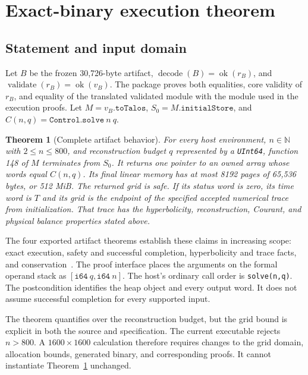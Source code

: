 \documentclass[11pt]{article}
\newcommand{\code}[1]{\texttt{#1}}
\newcommand{\NN}{\mathbb{N}}
\newtheorem{theorem}{Theorem}[section]
\begin{document}
\section{Exact-binary execution theorem}

\subsection{Statement and input domain}

Let $B$ be the frozen 30,726-byte artifact, $\operatorname{decode}(B)=\operatorname{ok}(r_B)$, and $\operatorname{validate}(r_B)=\operatorname{ok}(v_B)$.  The package proves both equalities, core validity of $r_B$, and equality of the translated validated module with the module used in the execution proofs.  Let $M=v_B.\code{toTalos}$, $S_0=M.\code{initialStore}$, and $C(n,q)=\code{Control.solve}\ n\ q$.

\begin{theorem}[Complete artifact behavior]
\label{thm:artifact}
For every host environment, $n\in\NN$ with $2\leq n\leq800$, and reconstruction budget $q$ represented by a \code{UInt64}, function 148 of $M$ terminates from $S_0$.  It returns one pointer to an owned array whose words equal $C(n,q)$.  Its final linear memory has at most 8192 pages of 65,536 bytes, or 512 MiB.  The returned grid is safe.  If its status word is zero, its time word is $T$ and its grid is the endpoint of the specified accepted numerical trace from initialization.  That trace has the hyperbolicity, reconstruction, Courant, and physical balance properties stated above.
\end{theorem}

The four exported artifact theorems establish these claims in increasing scope: exact execution, safety and successful completion, hyperbolicity and trace facts, and conservation~\cite{spec,artifact}.  The proof interface places the arguments on the formal operand stack as $[\code{i64}\ q,\code{i64}\ n]$.  The host's ordinary call order is \code{solve(n,q)}.  The postcondition identifies the heap object and every output word.  It does not assume successful completion for every supported input.

The theorem quantifies over the reconstruction budget, but the grid bound is explicit in both the source and specification.  The current executable rejects $n>800$.  A $1600\times1600$ calculation therefore requires changes to the grid domain, allocation bounds, generated binary, and corresponding proofs.  It cannot instantiate Theorem~\ref{thm:artifact} unchanged.
\end{document}
